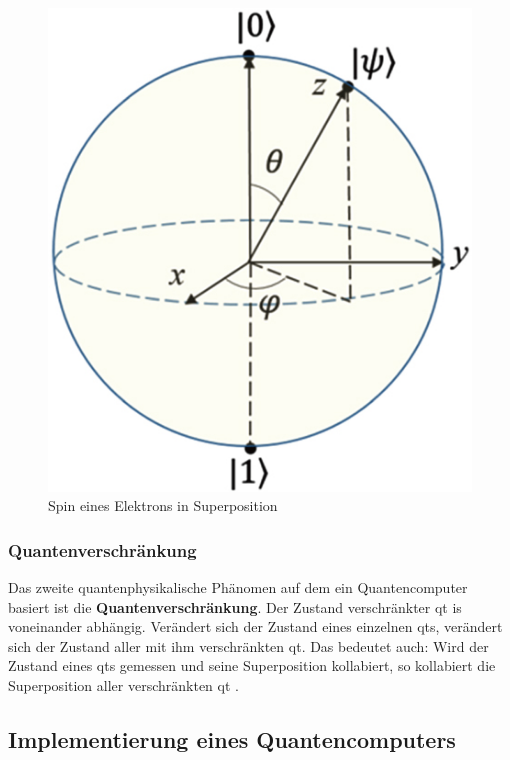 \begin{figure}[!hbt]
    \centering
    \includegraphics{./images/spin-superpostition.jpg}
    \caption{Spin eines Elektrons in Superposition \cite{noauthor_cpb_27_9_090308_f8jpg_nodate}}
    \label{fig:spin}
\end{figure}

\subsubsection{Quantenverschränkung}
Das zweite quantenphysikalische Phänomen auf dem ein Quantencomputer basiert ist die \textbf{Quantenverschränkung}. Der Zustand verschränkter \ac{qt} is voneinander abhängig. Verändert sich der Zustand eines einzelnen \ac{qt}s, verändert sich der Zustand aller mit ihm verschränkten \ac{qt}. Das bedeutet auch: Wird der Zustand eines \ac{qt}s gemessen und seine Superposition kollabiert, so kollabiert die Superposition aller verschränkten \ac{qt} \cite{miller_principles_nodate}.\\

\subsection{Implementierung eines Quantencomputers}


